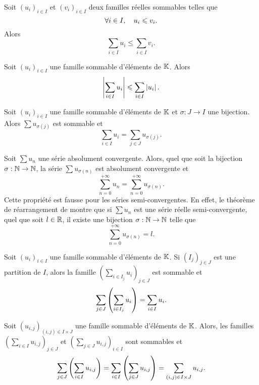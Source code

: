 \documentclass{magnolia}
\begin{document}
\begin{proposition}
  Soit $(u_i)_{i\in I}$ et $(v_i)_{i\in I}$ deux familles réelles sommables telles que
  \[\forall i\in I,\quad u_i\leqslant v_i.\]
  Alors
  \[\sum_{i\in I} u_i \leq \sum_{i\in I} v_i.\]
  \end{proposition}

\begin{proposition}
  Soit $(u_i)_{i\in I}$ une famille sommable d'éléments de $\mathbb{K}$. Alors
  \[\left|\sum_{i\in I} u_i\right|\leqslant\sum_{i\in I} \left|u_i\right|.\]
  \end{proposition}

\begin{proposition}
Soit $(u_i)_{i\in I}$ une famille sommable d'éléments de $\mathbb{K}$ et $\sigma:J\to I$ une bijection.
Alors $\sum u_{\sigma(j)}$ est sommable et
\[\sum_{i\in I} u_i=\sum_{j\in J} u_{\sigma(j)}.\]
\end{proposition}

\begin{remarques}
\remarque Soit $\sum u_n$ une série absolument convergente. Alors, quel que soit
  la bijection $\sigma:\mathbb{N}\to\mathbb{N}$, la série $\sum u_{\sigma(n)}$ est absolument convergente et
  \[\sum_{n=0}^{+\infty} u_n=\sum_{n=0}^{+\infty} u_{\sigma(n)}.\]
\remarque Cette propriété est fausse pour les séries semi-convergentes. En effet, le théorème de réarrangement
  de  montre que si $\sum u_n$ est une série réelle semi-convergente, quel que soit
  $l\in\mathbb{R}$, il existe une bijection $\sigma:\mathbb{N}\to\mathbb{N}$ telle que
  \[\sum_{n=0}^{+\infty} u_{\sigma(n)} = l.\]
\end{remarques}

\begin{proposition}[nom={Théorème de sommation par paquets}]
Soit $(u_i)_{i\in I}$ une famille sommable d'éléments de $\mathbb{K}$. Si $(I_j)_{j\in J}$ est
une partition de $I$, alors la famille $(\sum_{i\in I_j} u_i)_{j\in J}$ est sommable et
\[\sum_{j\in J} \left(\sum_{i\in I_j} u_i\right)=\sum_{i\in I} u_i.\]
\end{proposition}

\begin{proposition}[nom={Théorème de \nom{Fubini}}]
Soit $(u_{i,j})_{(i,j)\in I\times J}$ une famille sommable d'éléments de $\mathbb{K}$. Alors, les
familles $(\sum_{i\in I} u_{i,j})_{j\in J}$ et $(\sum_{j\in J} u_{i,j})_{i\in I}$ sont
sommables et
\[\sum_{j\in J} \left(\sum_{i\in I} u_{i,j}\right)=
  \sum_{i\in I} \left(\sum_{j\in J} u_{i,j}\right)=
  \sum_{(i,j)\in I\times J} u_{i,j}.\]
\end{proposition}
\end{document}
